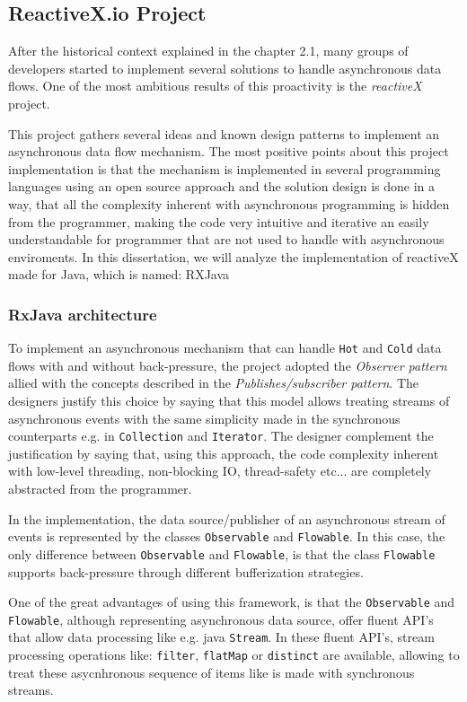 \subsection{ReactiveX.io Project}
\label{reactivex}

After the historical context explained in the chapter 2.1, many groups of developers started to implement several solutions to handle asynchronous data flows. One of the most ambitious results of this proactivity is the \textit{reactiveX} project.

This project gathers several ideas and known design patterns to implement an asynchronous data flow mechanism. 
The most positive points about this project implementation is that the mechanism is implemented in several programming languages using an open source approach and the solution design is done in a way, that all the complexity inherent with asynchronous programming is hidden from the programmer, making the code very intuitive and iterative an easily understandable for programmer that are not used to handle with asynchronous enviroments. 
In this dissertation, we will analyze the implementation of reactiveX made for Java, which is named: RXJava
\clearpage
\subsubsection{RxJava architecture}
\label{rxjava}
To implement an asynchronous mechanism that can handle \texttt{Hot} and \texttt{Cold} data flows with and without back-pressure, the project adopted the \textit{Observer pattern} allied with the concepts described in the \textit{Publishes/subscriber pattern}.
The designers justify this choice by saying that this model allows treating streams of asynchronous events with the same simplicity made in the synchronous counterparts e.g. in \texttt{Collection} and \texttt{Iterator}. The designer complement the justification by saying that, using this approach, the code complexity inherent with low-level threading, non-blocking IO, thread-safety etc... are completely abstracted from the programmer.

In the implementation, the data source/publisher of an asynchronous stream of events is represented by the classes \texttt{Observable} and \texttt{Flowable}. In this case, the only difference between \texttt{Observable} and \texttt{Flowable}, is that the class \texttt{Flowable} supports back-pressure through different bufferization strategies.

One of the great advantages of using this framework, is that the \texttt{Observable} and \texttt{Flowable}, although representing asynchronous data source, offer fluent API's that allow data processing like e.g. java \texttt{Stream}.
In these fluent API's, stream processing operations like: \texttt{filter}, \texttt{flatMap} or \texttt{distinct} are available, allowing to treat these asycnhronous sequence of items like is made with synchronous streams.


